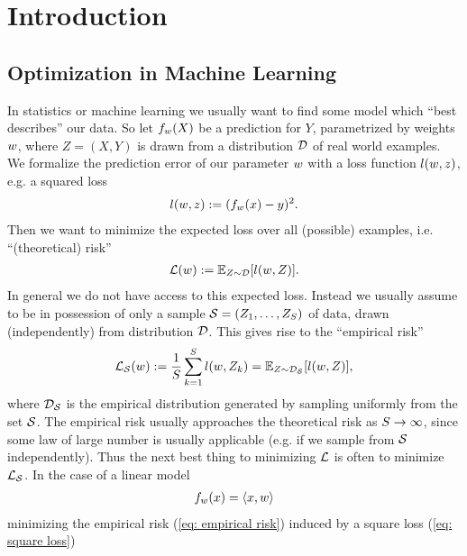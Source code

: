 
\chapter{Introduction}

\section{Optimization in Machine Learning}

In statistics or machine learning we usually want to find some model
which ``best describes'' our data. So let \(f_{w}(X)\) be a prediction for
\(Y\), parametrized by weights \(w\), where \(Z=(X,Y)\) is drawn from a
distribution \(\mathcal{D}\) of real world examples. We formalize the prediction error
of our parameter \(w\) with a loss function \(l(w, z)\), e.g. 
a squared loss
%
\begin{align}\label{eq: square loss}
	l(w, z) := (f_{w}(x) - y)^2.
\end{align}
%
Then we want to minimize the expected loss over all (possible) examples, i.e.
``(theoretical) risk''
%
\begin{align*}
	\mathcal{L}(w) := \mathbb{E}_{Z\sim \mathcal{D}} [l(w, Z)].
\end{align*}
In general we do not have access to this expected loss. Instead we usually
assume to be in possession of only a sample \(\mathcal{S}=(Z_1, \dots,
Z_{S})\) of data, drawn (independently) from distribution \(\mathcal{D}\).
This gives rise to the ``empirical risk''
\begin{align}\label{eq: empirical risk}
	\mathcal{L}_{\mathcal{S}}(w)
	:= \frac{1}{S}\sum_{k=1}^S l(w, Z_k)
	= \mathbb{E}_{Z\sim \mathcal{D}_{\mathcal{S}}}[l(w, Z)],
\end{align}
where \(\mathcal{D}_{\mathcal{S}}\) is the empirical distribution generated by sampling
uniformly from the set \(\mathcal{S}\). The empirical risk usually approaches
the theoretical risk as \(S\to\infty\), since some law of large number
is usually applicable (e.g. if we sample from \(\mathcal{S}\) independently). Thus the
next best thing to minimizing \(\mathcal{L}\) is often to minimize \(\mathcal{L}_{\mathcal{S}}\).
In the case of a linear model
\begin{align*}
	f_{w}(x) = \langle x, w \rangle
\end{align*}
minimizing the empirical risk (\ref{eq: empirical risk}) induced by a square
loss (\ref{eq: square loss})
